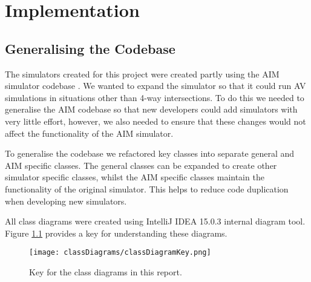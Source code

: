 \chapter{Implementation}
\label{cha:Implementation}

\section{Generalising the Codebase}
\label{sec:Generalising the Codebase}
The simulators created for this project were created partly using the AIM simulator codebase \citep{AIMWebsite}. We wanted to expand the simulator so that it could run AV simulations in situations other than 4-way intersections. To do this we needed to generalise the AIM codebase so that new developers could add simulators with very little effort, however, we also needed to ensure that these changes would not affect the functionality of the AIM simulator. 

To generalise the codebase we refactored key classes into separate general and AIM specific classes. The general classes can be expanded to create other simulator specific classes, whilst the AIM specific classes maintain the functionality of the original simulator. This helps to reduce code duplication when developing new simulators.

All class diagrams were created using IntelliJ IDEA 15.0.3 internal diagram tool. Figure \ref{fig:classDiagramKey} provides a key for understanding these diagrams.

\begin{figure}[htb]
\texttt{[image: classDiagrams/classDiagramKey.png]}
\caption{Key for the class diagrams in this report.}
\label{fig:classDiagramKey}
\end{figure}


